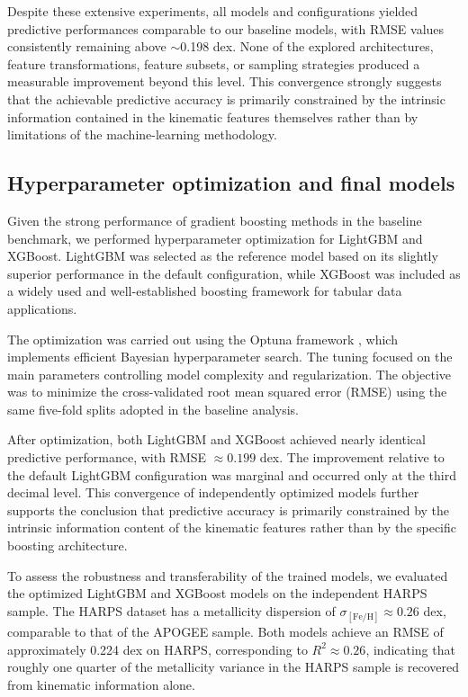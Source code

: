 \documentclass{aa}
\begin{document}
Despite these extensive experiments, all models and configurations yielded predictive performances comparable to our baseline models, with RMSE values consistently remaining above $\sim$0.198 dex. None of the explored architectures, feature transformations, feature subsets, or sampling strategies produced a measurable improvement beyond this level. This convergence strongly suggests that the achievable predictive accuracy is primarily constrained by the intrinsic information contained in the kinematic features themselves rather than by limitations of the machine-learning methodology.


\subsection{Hyperparameter optimization and final models}

Given the strong performance of gradient boosting methods in the baseline benchmark, we performed hyperparameter optimization for LightGBM and XGBoost. LightGBM was selected as the reference model based on its slightly superior performance in the default configuration, while XGBoost was included as a widely used and well-established boosting framework for tabular data applications.

The optimization was carried out using the Optuna framework \citep{Akiba-19}, which implements efficient Bayesian hyperparameter search. The tuning focused on the main parameters controlling model complexity and regularization. The objective was to minimize the cross-validated root mean squared error (RMSE) using the same five-fold splits adopted in the baseline analysis.

After optimization, both LightGBM and XGBoost achieved nearly identical predictive performance, with RMSE $\approx 0.199$ dex. The improvement relative to the default LightGBM configuration was marginal and occurred only at the third decimal level. This convergence of independently optimized models further supports the conclusion that predictive accuracy is primarily constrained by the intrinsic information content of the kinematic features rather than by the specific boosting architecture.

To assess the robustness and transferability of the trained models, we evaluated the optimized LightGBM and XGBoost models on the independent HARPS sample. The HARPS dataset has a metallicity dispersion of $\sigma_{\mathrm{[Fe/H]}} \approx 0.26$ dex, comparable to that of the APOGEE sample. Both models achieve an RMSE of approximately 0.224 dex on HARPS, corresponding to $R^2 \approx 0.26$, indicating that roughly one quarter of the metallicity variance in the HARPS sample is recovered from kinematic information alone.
\end{document}
